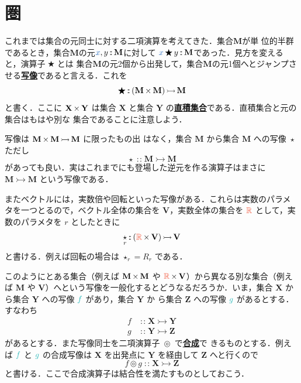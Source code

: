 \documentclass[a5paper,twoside,fleqn,draft]{jsbook}
\def\varColor{NavyBlue}
\def\funcColor{BlueGreen}
\def\typeColor{RedOrange}
\newcommand{\keyword}[1]{{\underline{\textbf{#1}}}}
\newcommand{\mVar}[1]{\textcolor{\varColor}{#1}}
\newcommand{\mXVar}{\mVar{x}}
\newcommand{\mFunc}[1]{\textcolor{\funcColor}{#1}}
\newcommand{\mFFunc}{{\mFunc{f}}}
\newcommand{\mGFunc}{\mFunc{g}}
\DeclareMathOperator{\mBinOp}{\bigstar}
\DeclareMathOperator{\mCompProj}{\circledcirc}
\DeclareMathOperator{\mIn}{{:\!:}}
\DeclareMathOperator{\mMorphTo}{\rightarrowtail} %
\DeclareMathOperator{\mSetTimes}{\bf{\times}} %
\DeclareMathOperator{\mUnOp}{\star}
\newcommand{\mSet}[1]{\mathbf{#1}}
\newcommand{\mSpecialSet}[1]{\textcolor{\typeColor}{\mathbb{#1}}}
\newcommand{\mRSet}{\mSpecialSet{R}}
\newcommand{\mMorph}[2]{#1\mMorphTo#2} %
\begin{document}
\section{圏}

これまでは集合の元同士に対する二項演算を考えてきた．集合$\mSet{M}$が単
位的半群であるとき，集合$\mSet{M}$の元$\mXVar,y\mIn\mSet{M}$に対して
$\mXVar\mBinOp y\mIn\mSet{M}$であった．見方を変えると，演算子$\mBinOp$とは
集合$\mSet{M}$の元2個から出発して，集合$\mSet{M}$の元1個へとジャンプさ
せる\keyword{写像}であると言える．これを
\begin{equation}
\mBinOp\mIn{}\mMorph{(\mSet{M}\mSetTimes\mSet{M})}{\mSet{M}}
\end{equation}
と書く．ここに $\mSet{X}\mSetTimes\mSet{Y}$ は集合 $\mSet{X}$ と集合
$\mSet{Y}$ の\keyword{直積集合}である．直積集合と元の集合はもはや別な
集合であることに注意しよう．

写像は $\mMorph{\mSet{M}\mSetTimes\mSet{M}}{\mSet{M}}$ に限ったもの出
はなく，集合 $\mSet{M}$ から集合 $\mSet{M}$ への写像 $\mUnOp$ ただし
\begin{equation}
\mUnOp\mIn\mMorph{\mSet{M}}{\mSet{M}}
\end{equation}
があっても良い．実はこれまでにも登場した逆元を作る演算子はまさに
$\mMorph{\mSet{M}}{\mSet{M}}$ という写像である．

またベクトルには，実数倍や回転といった写像がある．これらは実数のパラメ
タを一つとるので，ベクトル全体の集合を $\mSet{V}$，実数全体の集合を
$\mRSet$ として，実数のパラメタを $r$ としたときに
\begin{equation}
\mUnOp_r\mIn{}\mMorph{(\mRSet\mSetTimes\mSet{V})}{\mSet{V}}
\end{equation}
と書ける．例えば回転の場合は $\mUnOp_r=R_r$ である．

このようにとある集合（例えば $\mSet{M}\mSetTimes\mSet{M}$ や
$\mRSet\mSetTimes\mSet{V}$）から異なる別な集合（例えば $\mSet{M}$ や
$\mSet{V}$）へという写像を一般化するとどうなるだろうか．いま，集合
$\mSet{X}$ から集合 $\mSet{Y}$ への写像 $\mFFunc$ があり，集合 $\mSet{Y}$ か
ら集合 $\mSet{Z}$ への写像 $\mGFunc$ があるとする．すなわち
\begin{align}
f&\mIn\mMorph{\mSet{X}}{\mSet{Y}}\\
g&\mIn\mMorph{\mSet{Y}}{\mSet{Z}}
\end{align}
があるとする．また写像同士を二項演算子 $\mCompProj$ で\keyword{合成}で
きるものとする．例えば $\mFFunc$ と $\mGFunc$ の合成写像は $\mSet{X}$ を出発点に
$\mSet{Y}$ を経由して $\mSet{Z}$ へと行くので
\begin{equation}
f\mCompProj g\mIn\mMorph{\mSet{X}}{\mSet{Z}}
\end{equation}
と書ける．ここで合成演算子は結合性を満たすものとしておこう．
\end{document}

